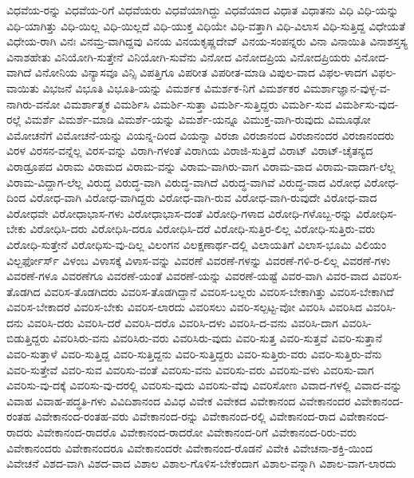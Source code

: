 {ವಿಧವೆಯ-ರನ್ನು
ವಿಧವೆಯ-ರಿಗೆ
ವಿಧವೆಯರು
ವಿಧವೆಯಾಗಿದ್ದು
ವಿಧವೆಯಾದ
ವಿಧಾತ
ವಿಧಾತನು
ವಿಧಿ
ವಿಧಿ-ಯನ್ನು
ವಿಧಿ-ಯಾಗಿತ್ತು
ವಿಧಿ-ಯಿಲ್ಲ
ವಿಧಿ-ಯಿಲ್ಲದೆ
ವಿಧಿ-ಯುಕ್ತ
ವಿಧಿಯೇ
ವಿಧಿ-ವತ್ತಾಗಿ
ವಿಧಿ-ವಿಲಾಸ
ವಿಧಿ-ಸುತ್ತಿದ್ದ
ವಿಧೇಯತೆ
ವಿಧೇಯ-ರಾಗಿ
ವಿನಃ
ವಿನಮ್ರ-ವಾಗಿದ್ದವು
ವಿನಯ
ವಿನಯಕೃಷ್ಣದೇವ್
ವಿನಯ-ಸಂಪನ್ನರು
ವಿನಾ
ವಿನಾಯಿತಿ
ವಿನಾಶಸ್ತಸ್ಯ
ವಿನಾಶಹೇತು
ವಿನಿಯೋಗಿ-ಸುತ್ತೇನೆ
ವಿನಿಯೋಗಿ-ಸುವೆನು
ವಿನೋದ
ವಿನೋದಪ್ರಿಯ
ವಿನೋದಪ್ರಿಯರು
ವಿನೋದ-ವಾಗಿದೆ
ವಿನೋನಿಯ
ವಿನ್ಯಾಸವೂ
ವಿನ್ಸಿ
ವಿಪತ್ತಿಗೂ
ವಿಪರೀತ
ವಿಪರೀತ-ಮಾಡಿ
ವಿಪುಲ-ವಾದ
ವಿಫಲ-ಳಾದಗ
ವಿಫಲ-ವಾಯಿತು
ವಿಭಜನೆ
ವಿಭೂತಿ
ವಿಭೂತಿ-ಯನ್ನು
ವಿಮರ್ಶಕ
ವಿಮರ್ಶಕ-ನಿಗೆ
ವಿಮರ್ಶಕರ
ವಿಮರ್ಶಾಜ್ಞಾನ-ವುಳ್ಳ-ವ-ನಾಗಿರು-ವನೋ
ವಿಮರ್ಶಾತ್ಮಕ
ವಿಮರ್ಶಿಸಿ
ವಿಮರ್ಶಿ-ಸುತ್ತಾ
ವಿಮರ್ಶಿ-ಸುತ್ತಿದ್ದರು
ವಿಮರ್ಶಿ-ಸುವ
ವಿಮರ್ಶಿಸು-ವುದ-ರಲ್ಲೆ
ವಿಮರ್ಶೆ
ವಿಮರ್ಶೆ-ಮಾಡಿ
ವಿಮರ್ಶೆ-ಯನ್ನು
ವಿಮರ್ಶೆ-ಯನ್ನೂ
ವಿಮುಕ್ತ-ವಾಗಿ-ರುವುದು
ವಿಮೂಢೋ
ವಿಮೋಚನೆಗೆ
ವಿಮೋಚನೆ-ಯನ್ನು
ವಿಯನ್ನ-ದಿಂದ
ವಿಯನ್ನಾ
ವಿರಜಾ
ವಿರಜಾನಂದ
ವಿರಜಾನಂದರ
ವಿರಜಾನಂದರು
ವಿರಳ
ವಿರಸನ-ವನ್ನೆಲ್ಲ
ವಿರಸ-ವನ್ನು
ವಿರಾಗಿ-ಗಳಂತೆ
ವಿರಾಗಿಯ
ವಿರಾಜಿ-ಸುತ್ತಿದೆ
ವಿರಾಟ್
ವಿರಾಟ್-ಚೈತನ್ಯದ
ವಿರಾಡ್ರೂಪದ
ವಿರಾಮ
ವಿರಾಮದ
ವಿರಾಮ-ವನ್ನು
ವಿರಾಮ-ವಾಗಿರು-ವಾಗ
ವಿರಾಮ-ವಾದ
ವಿರಾಮ-ವಾದಾಗ-ಲೆಲ್ಲ
ವಿರಾಮ-ವಿದ್ದಾಗ-ಲೆಲ್ಲ
ವಿರುದ್ಧ
ವಿರುದ್ಧ-ವಾಗಿ
ವಿರುದ್ಧ-ವಾಗಿದೆ
ವಿರುದ್ಧ-ವಾಗಿವೆ
ವಿರುದ್ಧ-ವಾದ
ವಿರೋಧ
ವಿರೋಧ-ದಿಂದ
ವಿರೋಧ-ವಾಗಿ
ವಿರೋಧ-ವಾಗಿದ್ದರು
ವಿರೋಧ-ವಾಗಿ-ರುವ
ವಿರೋಧ-ವಾಗಿ-ರುವುದೇ
ವಿರೋಧ-ವಾದ
ವಿರೋಧವೇ
ವಿರೋಧಾಭಾಸ-ಗಳು
ವಿರೋಧಾಭಾಸ-ದಂತೆ
ವಿರೋಧಿ-ಗಳಾದ
ವಿರೋಧಿ-ಗಳೊಬ್ಬ-ರನ್ನು
ವಿರೋಧಿಸ-ಬೇಕು
ವಿರೋಧಿಸಿ-ದರು
ವಿರೋಧಿಸಿ-ದರೂ
ವಿರೋಧಿಸಿ-ದರೆ
ವಿರೋಧಿ-ಸುತ್ತಿರ-ಲಿಲ್ಲ
ವಿರೋಧಿ-ಸುತ್ತಿರು-ವರು
ವಿರೋಧಿ-ಸುತ್ತೇನೆ
ವಿರೋಧಿಸು-ವು-ದಿಲ್ಲ
ವಿಲಂಗನ
ವಿಲಕ್ಷಣಾರ್ಥ-ದಲ್ಲಿ
ವಿಲಾಯತಿಗೆ
ವಿಲಾಸ-ಭೂಮಿ
ವಿಲಿಯಂ
ವಿಲ್ಬರ್ಫೋರ್ಸ್
ವಿಳಂಬ
ವಿಳಾಸಕ್ಕೆ
ವಿಳಾಸ-ವನ್ನು
ವಿವರಣೆ
ವಿವರಣೆ-ಗಳನ್ನು
ವಿವರಣೆ-ಗಳಿ-ರ-ಲಿಲ್ಲ
ವಿವರಣೆ-ಗಳು
ವಿವರಣೆ-ಗಳೂ
ವಿವರಣೆಗೂ
ವಿವರಣೆ-ಯಂತೆ
ವಿವರಣೆ-ಯನ್ನು
ವಿವರಣೆ-ಯಷ್ಟೆ
ವಿವರ-ವಾಗಿ
ವಿವರ-ವಾದ
ವಿವರಿಸ-ತೊಡಗಿದ
ವಿವರಿಸ-ತೊಡಗಿದರು
ವಿವರಿಸ-ತೊಡಗಿದ್ದಾನೆ
ವಿವರಿಸ-ಬಲ್ಲರು
ವಿವರಿಸ-ಬೇಕಾಗಿತ್ತು
ವಿವರಿಸ-ಬೇಕಾಗಿದೆ
ವಿವರಿಸ-ಬೇಕಾದರೆ
ವಿವರಿಸ-ಬೇಕು
ವಿವರಿಸ-ಲಾರದು
ವಿವರಿಸಲು
ವಿವರಿ-ಸಲ್ಪಟ್ಟ-ವೋ
ವಿವರಿಸಿ
ವಿವರಿಸಿದ
ವಿವರಿಸಿ-ದನು
ವಿವರಿಸಿ-ದರು
ವಿವರಿಸಿ-ದರೆ
ವಿವರಿಸಿ-ದರೊ
ವಿವರಿಸಿ-ದಳು
ವಿವರಿಸಿ-ದ-ವನು
ವಿವರಿಸಿ-ದಾಗ
ವಿವರಿಸಿ-ಬಿಡುತ್ತಿದ್ದರು
ವಿವರಿಸಿರು-ವನು
ವಿವರಿಸಿರು-ವರು
ವಿವರಿಸಿರು-ವುದು
ವಿವರಿ-ಸುತ್ತ
ವಿವರಿ-ಸುತ್ತವೆ
ವಿವರಿ-ಸುತ್ತಾನೆ
ವಿವರಿ-ಸುತ್ತಾಳೆ
ವಿವರಿ-ಸುತ್ತಿದ್ದ
ವಿವರಿ-ಸುತ್ತಿದ್ದನು
ವಿವರಿ-ಸುತ್ತಿದ್ದರು
ವಿವರಿ-ಸುತ್ತಿರು-ವರು
ವಿವರಿ-ಸುತ್ತಿರು-ವೆನು
ವಿವರಿ-ಸುತ್ತೇವೆ
ವಿವರಿ-ಸುವ
ವಿವರಿಸು-ವಂತೆ
ವಿವರಿಸು-ವನು
ವಿವರಿಸು-ವರು
ವಿವರಿಸು-ವಳು
ವಿವರಿಸು-ವಾಗ
ವಿವರಿಸು-ವು-ದಕ್ಕೆ
ವಿವರಿಸು-ವು-ದರಲ್ಲಿ
ವಿವರಿಸು-ವುದು
ವಿವರಿಸು-ವೆವು
ವಿವರಿಸೋಣ
ವಿವಾದ-ಗಳಲ್ಲಿ
ವಿವಾದ-ವನ್ನು
ವಿವಾಹ
ವಿವಾಹ-ಪದ್ಧತಿ-ಗಳು
ವಿವಿದಿಶಾನಂದ
ವಿವಿಧ
ವಿವೇಕ
ವಿವೇಕದ
ವಿವೇಕಾನಂದ
ವಿವೇಕಾನಂದರ
ವಿವೇಕಾನಂದ-ರಂತಹ
ವಿವೇಕಾನಂದ-ರಂತಹ-ವರು
ವಿವೇಕಾನಂದ-ರನ್ನು
ವಿವೇಕಾನಂದ-ರಲ್ಲಿ
ವಿವೇಕಾನಂದ-ರಾದ
ವಿವೇಕಾನಂದ-ರಾದರು
ವಿವೇಕಾನಂದ-ರಾದರೊ
ವಿವೇಕಾನಂದ-ರಾದರೋ
ವಿವೇಕಾನಂದ-ರಿಗೆ
ವಿವೇಕಾನಂದ-ರಿರು-ವರು
ವಿವೇಕಾನಂದರು
ವಿವೇಕಾನಂದರೂ
ವಿವೇಕಾನಂದರೇ
ವಿವೇಕಾನಂದ-ರೊಡನೆ
ವಿವೇಕಿ
ವಿವೇಚನಾ-ಶಕ್ತಿ-ಯಿಂದ
ವಿವೇಚನೆ
ವಿಶದ-ವಾಗಿ
ವಿಶದ-ವಾದ
ವಿಶಾಲ
ವಿಶಾಲ-ಗೊಳಿಸ-ಬೇಕೆಂದಾಗ
ವಿಶಾಲ-ವನ್ನಾಗಿ
ವಿಶಾಲ-ವಾಗ-ಲಾರದು
}
